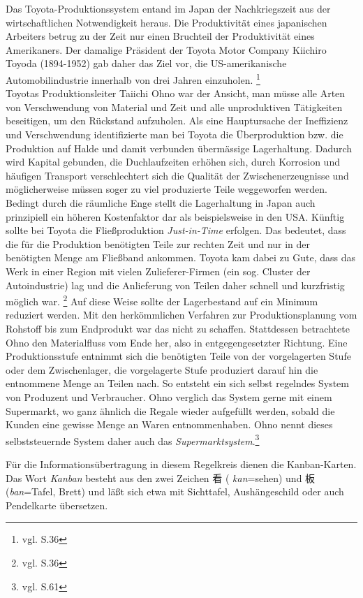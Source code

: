 Das Toyota-Produktionssystem entand im Japan der Nachkriegszeit 
aus der wirtschaftlichen Notwendigkeit heraus. 
Die Produktivität eines japanischen Arbeiters betrug zu der Zeit nur einen Bruchteil der Produktivität eines Amerikaners. 
Der damalige Präsident der Toyota Motor Company Kiichiro Toyoda (1894-1952) gab daher das Ziel vor, 
die US-amerikanische Automobilindustrie innerhalb von drei Jahren  einzuholen. \footnote{vgl. \cite{Ohno2013TPS} S.36}\\
Toyotas Produktionsleiter Taiichi Ohno war der Ansicht, man müsse alle Arten von 
Verschwendung von Material und Zeit und alle unproduktiven Tätigkeiten 
beseitigen, um den Rückstand aufzuholen. Als eine Hauptursache der Ineffizienz 
und Verschwendung identifizierte man bei Toyota die Überproduktion bzw. die Produktion auf 
Halde und damit verbunden übermässige Lagerhaltung. Dadurch wird Kapital gebunden, 
die Duchlaufzeiten erhöhen sich, durch Korrosion und häufigen Transport verschlechtert
sich die Qualität der Zwischenerzeugnisse und möglicherweise müssen soger zu viel
produzierte Teile weggeworfen werden. Bedingt durch die räumliche Enge stellt die 
Lagerhaltung in Japan auch prinzipiell ein höheren Kostenfaktor dar als beispielsweise in den USA.
Künftig sollte bei Toyota die Fließproduktion \emph{Just-in-Time} erfolgen. 
Das bedeutet, dass die für die Produktion benötigten Teile zur rechten Zeit und 
nur in der benötigten Menge am Fließband ankommen.
Toyota kam dabei zu Gute, dass das Werk in einer Region mit vielen Zulieferer-Firmen (ein sog. Cluster der Autoindustrie)
lag und die Anlieferung von Teilen daher schnell und kurzfristig möglich war. \footnote{vgl. \cite{Economist2009Ohno} S.36}
Auf diese Weise sollte der Lagerbestand auf ein Minimum reduziert werden.
Mit den herkömmlichen Verfahren zur Produktionsplanung vom Rohstoff 
bis zum Endprodukt war das nicht zu schaffen.
Stattdessen betrachtete Ohno den Materialfluss vom Ende her, also in entgegengesetzter Richtung.
Eine Produktionsstufe entnimmt sich die benötigten Teile von der vorgelagerten Stufe oder dem Zwischenlager,
die vorgelagerte Stufe produziert darauf hin die entnommene Menge an Teilen nach.
So entsteht ein sich selbst regelndes System von Produzent und Verbraucher.
Ohno verglich das System gerne mit einem Supermarkt, wo ganz ähnlich die Regale wieder aufgefüllt werden, 
sobald die Kunden eine gewisse Menge an Waren entnommenhaben. 
Ohno nennt dieses selbststeuernde System daher auch das \emph{Supermarktsystem}.\footnote{vgl. \cite{Ohno2013TPS} S.61}

Für die Informationsübertragung in diesem Regelkreis dienen die Kanban-Karten.
Das Wort \emph{Kanban} besteht aus den zwei Zeichen {\CN 看} ( \emph{kan}=sehen)
 und {\CN 板} (\emph{ban}=Tafel, Brett) und läßt sich etwa mit Sichttafel, 
 Aushängeschild oder auch Pendelkarte übersetzen.


